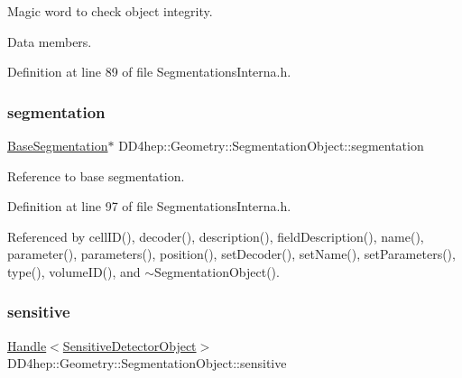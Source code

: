 Magic word to check object integrity. 

Data members. 

Definition at line 89 of file Segmentations\+Interna.\+h.

\hypertarget{class_d_d4hep_1_1_geometry_1_1_segmentation_object_a96eb25f8256d85ec907729f371ad315c}{}\label{class_d_d4hep_1_1_geometry_1_1_segmentation_object_a96eb25f8256d85ec907729f371ad315c} 
\subsubsection{\texorpdfstring{segmentation}{segmentation}}
{\footnotesize\ttfamily \hyperlink{class_d_d4hep_1_1_geometry_1_1_segmentation_object_a57ca8eb515f079fdc61916df50468818}{Base\+Segmentation}$\ast$ D\+D4hep\+::\+Geometry\+::\+Segmentation\+Object\+::segmentation}



Reference to base segmentation. 



Definition at line 97 of file Segmentations\+Interna.\+h.



Referenced by cell\+I\+D(), decoder(), description(), field\+Description(), name(), parameter(), parameters(), position(), set\+Decoder(), set\+Name(), set\+Parameters(), type(), volume\+I\+D(), and $\sim$\+Segmentation\+Object().

\hypertarget{class_d_d4hep_1_1_geometry_1_1_segmentation_object_ae62042fd318764e7744b87de21cb25ad}{}\label{class_d_d4hep_1_1_geometry_1_1_segmentation_object_ae62042fd318764e7744b87de21cb25ad} 
\subsubsection{\texorpdfstring{sensitive}{sensitive}}
{\footnotesize\ttfamily \hyperlink{class_d_d4hep_1_1_handle}{Handle}$<$\hyperlink{class_d_d4hep_1_1_geometry_1_1_sensitive_detector_object}{Sensitive\+Detector\+Object}$>$ D\+D4hep\+::\+Geometry\+::\+Segmentation\+Object\+::sensitive}




